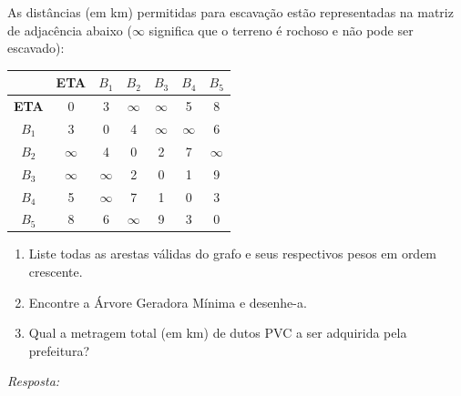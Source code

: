 \documentclass[12pt]{article}
\newcommand{\quadro}[1]{\vspace{0.2cm}\begin{tcolorbox}[colback=white, colframe=black, height=#1, boxrule=0.5pt, arc=0pt] \textit{Resposta:} \end{tcolorbox}}
\begin{document}
\begin{enumerate}[label=\arabic*), leftmargin=1.5cm, itemsep=0.8cm]
As distâncias (em km) permitidas para escavação estão representadas na matriz de adjacência abaixo ($\infty$ significa que o terreno é rochoso e não pode ser escavado):
\begin{center}
    \begin{tabular}{c|cccccc}
        & \textbf{ETA} & \textbf{$B_1$} & \textbf{$B_2$} & \textbf{$B_3$} & \textbf{$B_4$} & \textbf{$B_5$} \\ \hline
        \textbf{ETA}& 0 & 3 & $\infty$ & $\infty$ & 5 & 8 \\
        \textbf{$B_1$} & 3 & 0 & 4 & $\infty$ & $\infty$ & 6 \\
        \textbf{$B_2$} & $\infty$ & 4 & 0 & 2 & 7 & $\infty$ \\
        \textbf{$B_3$} & $\infty$ & $\infty$ & 2 & 0 & 1 & 9 \\
        \textbf{$B_4$} & 5 & $\infty$ & 7 & 1 & 0 & 3 \\
        \textbf{$B_5$} & 8 & 6 & $\infty$ & 9 & 3 & 0 \\
    \end{tabular}
\end{center}
\begin{enumerate}[label=\alph*)]
    \item Liste todas as arestas válidas do grafo e seus respectivos pesos em ordem crescente.
    \item Encontre a Árvore Geradora Mínima e desenhe-a.
    \item Qual a metragem total (em km) de dutos PVC a ser adquirida pela prefeitura?
\end{enumerate}
\quadro{7cm}


\end{enumerate}
\end{document}
